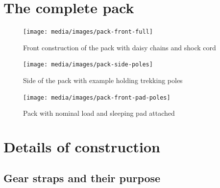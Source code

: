 \section{The complete pack}


\begin{figure}[H]
  \texttt{[image: media/images/pack-front-full]}
  \caption{Front construction of the pack with daisy chains and shock cord}
  \label{img:pack-front-full}
\end{figure}

\begin{figure}[H]
  \centering
  \texttt{[image: media/images/pack-side-poles]}
  \caption{Side of the pack with example holding trekking poles}
  \label{img:pack-side-poles}
\end{figure}

\begin{figure}[H]
  \centering
  \texttt{[image: media/images/pack-front-pad-poles]}
  \caption{Pack with nominal load and sleeping pad attached}
  \label{img:pack-front-pad-poles}
\end{figure}

\section{Details of construction}

\subsection{Gear straps and their purpose}

